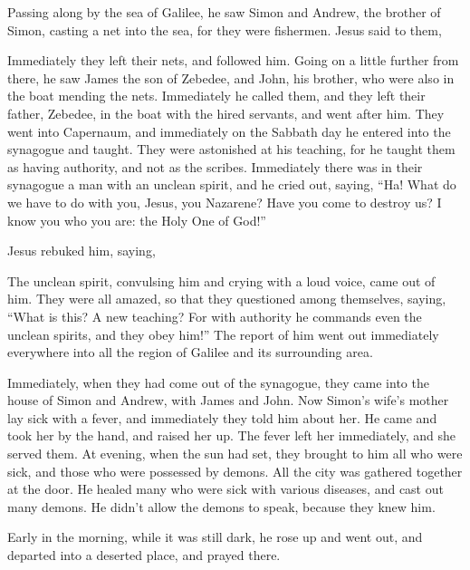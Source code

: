 {\par }{\PP {}Passing along by the sea of Galilee, he saw Simon and Andrew, the brother of Simon, casting a net into the sea, for they were fishermen.
Jesus said to them,
{}
\par }{\PP {}Immediately they left their nets, and followed him.
Going on a little further from there, he saw James the son of Zebedee, and John, his brother, who were also in the boat mending the nets.
Immediately he called them, and they left their father, Zebedee, in the boat with the hired servants, and went after him.
They went into Capernaum, and immediately on the Sabbath day he entered into the synagogue and taught.
They were astonished at his teaching, for he taught them as having authority, and not as the scribes.
Immediately there was in their synagogue a man with an unclean spirit, and he cried out,
saying, “Ha! What do we have to do with you, Jesus, you Nazarene? Have you come to destroy us? I know you who you are: the Holy One of God!”
\par }{\PP {}Jesus rebuked him, saying,
{}
\par }{\PP {}The unclean spirit, convulsing him and crying with a loud voice, came out of him.
They were all amazed, so that they questioned among themselves, saying, “What is this? A new teaching? For with authority he commands even the unclean spirits, and they obey him!”
The report of him went out immediately everywhere into all the region of Galilee and its surrounding area.
\par }{\PP {}Immediately, when they had come out of the synagogue, they came into the house of Simon and Andrew, with James and John.
Now Simon’s wife’s mother lay sick with a fever, and immediately they told him about her.
He came and took her by the hand, and raised her up. The fever left her immediately, and she served them.
At evening, when the sun had set, they brought to him all who were sick, and those who were possessed by demons.
All the city was gathered together at the door.
He healed many who were sick with various diseases, and cast out many demons. He didn’t allow the demons to speak, because they knew him.
\par }{\PP {}Early in the morning, while it was still dark, he rose up and went out, and departed into a deserted place, and prayed there.
}
